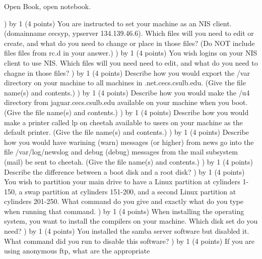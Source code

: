 
\parindent=0in
\nopagenumbers
\newcount\quesno
{}
\def\ques{\number\quesno) \advance\quesno by 1}
\def\aspace{\vskip 1.5in}

Open Book, open notebook.

\ques
(4 points)
You are instructed to set your machine as an NIS client. (domainname cecsyp,
ypserver 134.139.46.6).  
Which files will you need to edit or create, and what do you need to change
or place in those files?
(Do NOT include files files from {\ltt{}rc.d} in your answer.)
\vskip 1.0in
\ques
(4 points)
You wish logins on your NIS client to use NIS.
Which files will you need need to edit, 
and what do you need to chagne in those files?
\ques
(4 points)
Describe how you would
export the {\ltt{}/var} directory on your machine to all
machines in {\ltt{}.net.cecs.csulb.edu}.
(Give the file name(s) and contents.)
\vskip 1.0in
\ques
(4 points)
Describe how you would make
the {\ltt{}/u4} directory from {\ltt{}jaguar.cecs.csulb.edu}
available on your machine when you boot.
(Give the file name(s) and contents.)
\vskip 1.0in
\ques
(4 points)
Describe how you would make
a printer called {\ltt{}lp} on {\ltt{}cheetah} available to
users on your machine as the default printer.
(Give the file name(s) and contents.)
\vskip 1.0in
\ques
(4 points)
Describe how you would have
warining ({\ltt{}warn}) messages (or higher) from {\ltt{}news}
go into the file {\ltt{}/var/log/newslog}
and
debug ({\ltt{}debug}) messages from the mail subsystem ({\ltt{}mail})
be sent to {\ltt{}cheetah}.
(Give the file name(s) and contents.)
\vskip 1.8in
\ques
(4 points)
Describe the difference between a boot disk and a root disk?
\vskip 1.0in
\ques
(4 points)
You wish to partition your main drive to have a Linux partition
at cylinders 1-150, a swap partition at cylinders 151-200,
and a second Linux partition at cylinders 201-250.
What command do you give and exactly what do you type when
running that command.
\vskip 3.0in
\ques
(4 points)
When installing the operating system, 
you want to install the compilers on your machine.
Which disk set do you need?
\vskip 0.5in
\ques
(4 points)
You installed the samba server software but disabled it.
What command did you run to disable this software?
\vskip 0.5in
\ques
(4 points)
If you are using anonymous ftp, what are the appropriate

